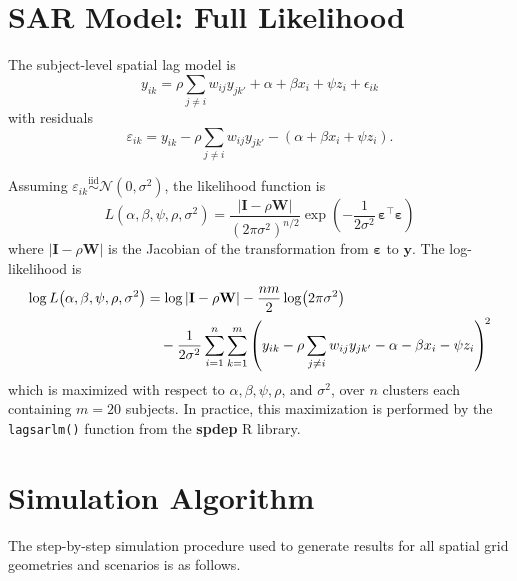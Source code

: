 \documentclass{article}[11pt]
\begin{document}
\section{SAR Model: Full Likelihood}\label{appendix:SARLikelihood}

The subject-level spatial lag model is
\begin{equation}
    y_{ik} = \rho \sum_{j \neq i} w_{ij} y_{jk'} + \alpha + \beta x_i + \psi z_i + \epsilon_{ik}
\end{equation}
with residuals
\begin{equation}
    \varepsilon_{ik} = y_{ik} - \rho \sum_{j \neq i} w_{ij} y_{jk'} - \left(\alpha + \beta x_i + \psi z_i\right).
\end{equation}

Assuming $\varepsilon_{ik} \overset{\text{iid}}{\sim} \mathcal{N}(0,\sigma^2)$, the likelihood function is
\begin{equation}
    L\!\left(\alpha,\beta,\psi,\rho,\sigma^2\right)
    = \frac{|\mathbf{I} - \rho\mathbf{W}|}{\left(2\pi\sigma^2\right)^{n/2}}
      \exp\!\left(-\frac{1}{2\sigma^2}\,\boldsymbol{\varepsilon}^{\top}\boldsymbol{\varepsilon}\right)
\end{equation}
where $|\mathbf{I}-\rho\mathbf{W}|$ is the Jacobian of the transformation from $\boldsymbol{\varepsilon}$ to $\mathbf{y}$. The log-likelihood is
\begin{align}
    \log L\!\left(\alpha,\beta,\psi,\rho,\sigma^2\right)
    &= \log|\mathbf{I} - \rho\mathbf{W}|
       - \frac{nm}{2}\log\!\left(2\pi\sigma^2\right) \notag \\
    &\quad - \frac{1}{2\sigma^2}
        \sum_{i=1}^{n}\sum_{k=1}^{m}
        \left(y_{ik} - \rho\sum_{j \neq i}w_{ij}y_{jk'} - \alpha - \beta x_i - \psi z_i\right)^{\!2}
\end{align}
which is maximized with respect to $\alpha, \beta, \psi, \rho$, and $\sigma^2$, over $n$ clusters each containing $m = 20$ subjects. In practice, this maximization is performed by the \texttt{lagsarlm()} function from the \textbf{spdep} R library\cite{bivand_r_2022}.

\section{Simulation Algorithm}\label{appendix:SimAlgorithm}

The step-by-step simulation procedure used to generate results for all spatial grid geometries and scenarios is as follows.
\end{document}
